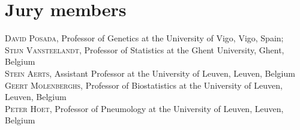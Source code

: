 
\chapter*{Jury members}


\noindent \textsc{David Posada}, Professor of Genetics at the University of Vigo, Vigo, Spain; \\

\noindent \textsc{Stijn Vansteelandt}, Professor of Statistics at the Ghent University, Ghent, Belgium \\

\noindent \textsc{Stein Aerts}, Assistant Professor at the University of Leuven, Leuven, Belgium \\

\noindent \textsc{Geert Molenberghs}, Professor of Biostatistics at the University of Leuven, Leuven, Belgium \\

\noindent \textsc{Peter Hoet}, Professor of Pneumology at the University of Leuven, Leuven, Belgium \\



